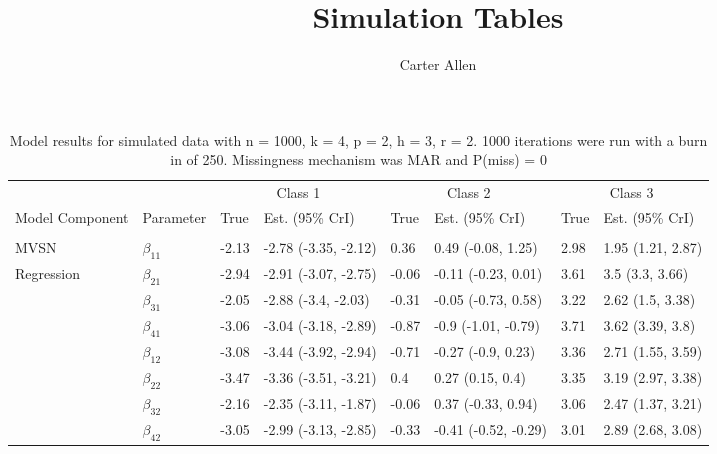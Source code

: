 \documentclass[]{article}
\title{Simulation Tables}
\author{Carter Allen}
\date{}
\begin{document}
\maketitle

\begin{table}[t]

\caption{\label{tab:unnamed-chunk-4}Model results for simulated data with n = 1000, k = 4, p = 2, h = 3, r = 2. 1000 iterations were run with a burn in of 250. Missingness mechanism was MAR and P(miss) = 0}
\centering
\fontsize{8}{10}\selectfont
\begin{tabular}{llllllll}
\toprule
\multicolumn{2}{c}{ } & \multicolumn{2}{c}{Class 1} & \multicolumn{2}{c}{Class 2} & \multicolumn{2}{c}{Class 3} \\
\cmidrule(l{3pt}r{3pt}){3-4} \cmidrule(l{3pt}r{3pt}){5-6} \cmidrule(l{3pt}r{3pt}){7-8}
Model Component & Parameter & True & Est. (95\% CrI) & True & Est. (95\% CrI) & True & Est. (95\% CrI)\\
\midrule
\addlinespace[0.3em]
\multicolumn{8}{l}{\textbf{ }}\\
\hspace{1em}MVSN & $\beta_{11}$ & -2.13 & -2.78 (-3.35, -2.12) & 0.36 & 0.49 (-0.08, 1.25) & 2.98 & 1.95 (1.21, 2.87)\\
\hspace{1em}Regression & $\beta_{21}$ & -2.94 & -2.91 (-3.07, -2.75) & -0.06 & -0.11 (-0.23, 0.01) & 3.61 & 3.5 (3.3, 3.66)\\
\hspace{1em} & $\beta_{31}$ & -2.05 & -2.88 (-3.4, -2.03) & -0.31 & -0.05 (-0.73, 0.58) & 3.22 & 2.62 (1.5, 3.38)\\
\hspace{1em} & $\beta_{41}$ & -3.06 & -3.04 (-3.18, -2.89) & -0.87 & -0.9 (-1.01, -0.79) & 3.71 & 3.62 (3.39, 3.8)\\
\hspace{1em} & $\beta_{12}$ & -3.08 & -3.44 (-3.92, -2.94) & -0.71 & -0.27 (-0.9, 0.23) & 3.36 & 2.71 (1.55, 3.59)\\
\hspace{1em} & $\beta_{22}$ & -3.47 & -3.36 (-3.51, -3.21) & 0.4 & 0.27 (0.15, 0.4) & 3.35 & 3.19 (2.97, 3.38)\\
\hspace{1em} & $\beta_{32}$ & -2.16 & -2.35 (-3.11, -1.87) & -0.06 & 0.37 (-0.33, 0.94) & 3.06 & 2.47 (1.37, 3.21)\\
\hspace{1em} & $\beta_{42}$ & -3.05 & -2.99 (-3.13, -2.85) & -0.33 & -0.41 (-0.52, -0.29) & 3.01 & 2.89 (2.68, 3.08)\\

\end{tabular}
\end{table}
\end{document}
